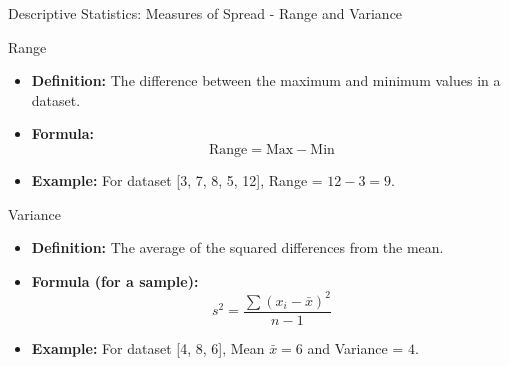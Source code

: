 \documentclass[aspectratio=169]{beamer}
\begin{document}
\begin{frame}[fragile]{Descriptive Statistics: Measures of Spread - Range and Variance}
    \begin{block}{Range}
        \begin{itemize}
            \item \textbf{Definition:} The difference between the maximum and minimum values in a dataset.
            \item \textbf{Formula:} 
            \[
            \text{Range} = \text{Max} - \text{Min}
            \]
            \item \textbf{Example:} For dataset [3, 7, 8, 5, 12], Range = \(12 - 3 = 9\).
        \end{itemize}
    \end{block}

    \begin{block}{Variance}
        \begin{itemize}
            \item \textbf{Definition:} The average of the squared differences from the mean.
            \item \textbf{Formula (for a sample):} 
            \[
            s^2 = \frac{\sum (x_i - \bar{x})^2}{n - 1}
            \]
            \item \textbf{Example:} For dataset [4, 8, 6], Mean \( \bar{x} = 6\) and Variance = \(4\).
        \end{itemize}
    \end{block}
\end{frame}
\end{document}
